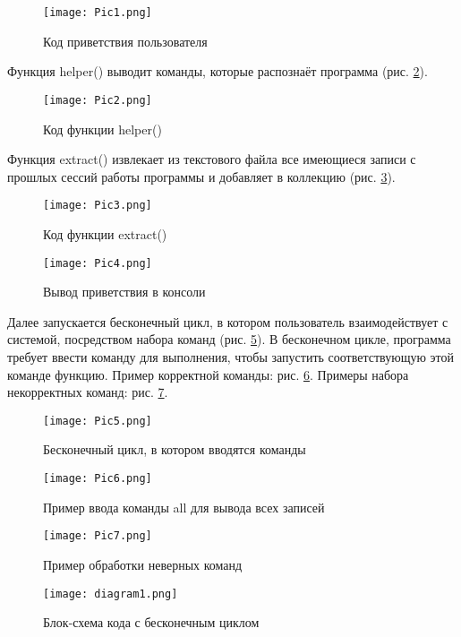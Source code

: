 \documentclass[14pt]{extreport}
\begin{document}
\begin{figure}[H]
\centerline{\texttt{[image: Pic1.png]}}
\caption{Код приветствия пользователя}
\label{fig11}
\end{figure}

Функция helper() выводит команды, которые распознаёт программа (рис. \ref{fig12}). 

\begin{figure}[H]
\centerline{\texttt{[image: Pic2.png]}}
\caption{Код функции helper()}
\label{fig12}
\end{figure}

Функция extract() извлекает из текстового файла все имеющиеся записи с прошлых сессий работы программы и добавляет в коллекцию (рис. \ref{fig13}). 

\begin{figure}[H]
\centerline{\texttt{[image: Pic3.png]}}
\caption{Код функции extract()}
\label{fig13}
\end{figure}

\begin{figure}[H]
\centerline{\texttt{[image: Pic4.png]}}
\caption{Вывод приветствия в консоли}
\label{fig14}
\end{figure}

Далее запускается бесконечный цикл, в котором пользователь взаимодействует с системой, посредством набора команд (рис. \ref{fig15}). В бесконечном цикле, программа требует ввести команду для выполнения, чтобы запустить соответствующую этой команде функцию. Пример корректной команды: рис. \ref{fig16}. Примеры набора некорректных команд: рис. \ref{fig17}.

\begin{figure}[H]
\centerline{\texttt{[image: Pic5.png]}}
\caption{Бесконечный цикл, в котором вводятся команды}
\label{fig15}
\end{figure}

\begin{figure}[H]
\centerline{\texttt{[image: Pic6.png]}}
\caption{Пример ввода команды all для вывода всех записей}
\label{fig16}
\end{figure}

\begin{figure}[H]
\centerline{\texttt{[image: Pic7.png]}}
\caption{Пример обработки неверных команд}
\label{fig17}
\end{figure}

\begin{figure}[H]
\centerline{\texttt{[image: diagram1.png]}}
\caption{Блок-схема кода с бесконечным циклом}
\end{figure}
\end{document}
